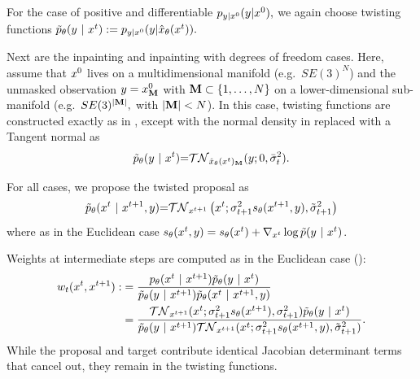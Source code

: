 For the case of positive and differentiable $p_{y|x^{0}}({y}|{x^{0}}),$ we again choose twisting functions $\tilde p_\theta(y~\vert~ x^{t}):= p_{y|x^{0}}({y}|{{\hat x}_\theta(x^{t})}).$

Next are the inpainting and inpainting with degrees of freedom cases.
Here, assume that $x^{0}$ lives on a multidimensional manifold (e.g.\ $SE(3)^N$)
and the unmasked observation $y=x^{0}_{\mathbf{M}}$ with $\mathbf{M} \subset \{1, \dots, N\}$ on a lower-dimensional sub-manifold (e.g.\ $SE(3)^{|\mathbf{M}|},$ with $|\mathbf{M}|<N$).
In this case, twisting functions are constructed exactly as in , 
except with the normal density in  replaced with a Tangent normal as
\begin{align}
\tilde p_\theta(y~\vert~ x^{t}) {=} \mathcal{TN}_{{\hat x}_\theta(x^{t})_{\mathbf{M}}}( y ; 0, \bar \sigma_t^2).
\end{align}

For all cases, we propose the twisted proposal as
\begin{equation}\label{eqn:likelihood_approx_riemannian_supp}
    \tilde p_\theta(x^{t} ~\vert~ x^{t+1}, y) {=} \mathcal{TN}_{x^{t+1}}\left(x^{t};\sigma_{t+1}^2 s_\theta(x^{t+1}, y), \tilde\sigma_{t+1}^2 \right)
\end{equation}
where as in the Euclidean case  $s_\theta(x^{t}, y)=s_\theta(x^{t}) + \nabla_{x^{t}} \log \tilde p(y ~\vert~ x^{t})$.


Weights at intermediate steps are computed as in the Euclidean case (): 
\begin{align}\label{eq:diffusion-twisted-weigthing-functions-riemannian}
    w_t (x^{t} , x^{t+1} ):&= \frac{p_{\theta} (x^{t} ~\vert~ x^{t+1}) \tilde p_\theta(y ~\vert~ x^{t})}{\tilde p_\theta(y ~\vert~ x^{t+1}) \tilde p_\theta(x^{t} ~\vert~ x^{t+1}, y)} \\
    &= \frac{\mathcal{TN}_{x^{t+1}}(x^{t}; \sigma_{t+1}^2s_\theta(x^{t+1}), \sigma_{t+1}^2) \tilde p_\theta(y ~\vert~ x^{t})
    }{\tilde p_\theta(y ~\vert~ x^{t+1}) \mathcal{TN}_{x^{t+1}}(x^{t}; \sigma_{t+1}^2s_\theta(x^{t+1}, y), \tilde\sigma_{t+1}^2)}.
\end{align}
While the proposal and target contribute identical Jacobian determinant terms that cancel out, they remain in the twisting functions.


